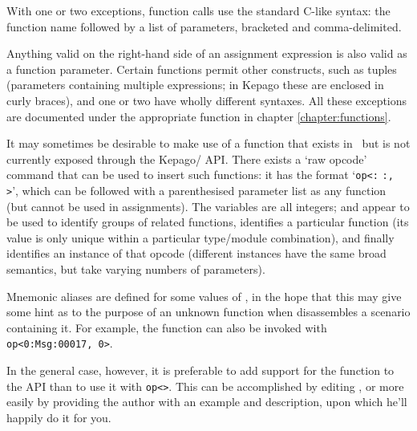   \label{sec:functioncalls}

    With one or two exceptions, function calls use the standard C-like syntax:
    the function name followed by a list of parameters, bracketed and
    comma-delimited.

    Anything valid on the right-hand side of an assignment expression is also
    valid as a function parameter.  Certain functions permit other constructs,
    such as tuples (parameters containing multiple expressions; in Kepago these
    are enclosed in curly braces), and one or two have wholly different
    syntaxes.  All these exceptions are documented under the appropriate
    function in chapter \ref{chapter:functions}.


      It may sometimes be desirable to make use of a function that exists in
      \reallive\ but is not currently exposed through the Kepago/\reallive{}
      API\@. There exists a `raw opcode' command that can be used to insert such
      functions: it has the format `\lstinline|op<|\lstinline|:|%
      \lstinline|:|\lstinline|, |%
      \lstinline|>|', which can be followed with a
      parenthesised parameter list as any function (but cannot be used in
      assignments).  The variables are all integers;  and
       appear to be used to identify groups of related
      functions,  identifies a particular function (its value is
      only unique within a particular type/module combination), and finally
       identifies an instance of that opcode (different
      instances have the same broad semantics, but take varying numbers of
      parameters).

      Mnemonic aliases are defined for some values of , in the
      hope that this may give some hint as to the purpose of an unknown function
      when \archiver{} disassembles a scenario containing it.  For example, the
       function can also be invoked with
      \lstinline|op<0:Msg:00017, 0>|.

      In the general case, however, it is preferable to add support for the
      function to the API than to use it with \lstinline|op<>|.  This can be
      accomplished by editing , or more easily by providing
      the author with an example and description, upon which he'll happily do it
      for you.

